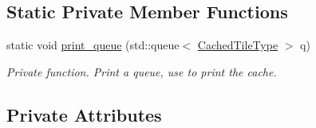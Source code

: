 \subsection*{Static Private Member Functions}
\begin{DoxyCompactItemize}
\item 
static void \hyperlink{classfi_1_1FigCache_ae4968e08ba288e6df782364a368ff708}{print\+\_\+queue} (std\+::queue$<$ \hyperlink{classfi_1_1FigCache_a7b9bbc4a832c01c3a461f573445c3c41}{Cached\+Tile\+Type} $>$ q)
\begin{DoxyCompactList}\small\item\em Private function. Print a queue, use to print the cache. \end{DoxyCompactList}\end{DoxyCompactItemize}
\subsection*{Private Attributes}
